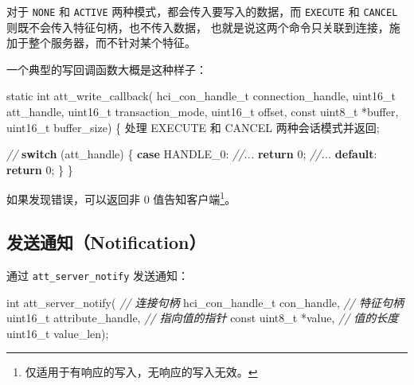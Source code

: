 \documentclass[
  12pt,
]{book}
\newenvironment{Shaded}{\begin{snugshade}}{\end{snugshade}}
\newcommand{\CommentTok}[1]{\textcolor[rgb]{0.56,0.35,0.01}{\textit{#1}}}
\newcommand{\ControlFlowTok}[1]{\textcolor[rgb]{0.13,0.29,0.53}{\textbf{#1}}}
\newcommand{\DataTypeTok}[1]{\textcolor[rgb]{0.13,0.29,0.53}{#1}}
\newcommand{\DecValTok}[1]{\textcolor[rgb]{0.00,0.00,0.81}{#1}}
\newcommand{\NormalTok}[1]{#1}
\begin{document}
对于 \texttt{NONE} 和 \texttt{ACTIVE} 两种模式，都会传入要写入的数据，而 \texttt{EXECUTE} 和 \texttt{CANCEL} 则既不会传入特征句柄，也不传入数据，
也就是说这两个命令只关联到连接，施加于整个服务器，而不针对某个特征。

一个典型的写回调函数大概是这种样子：

\begin{Shaded}
\begin{Highlighting}[]
\DataTypeTok{static} \DataTypeTok{int}\NormalTok{ att_write_callback(}
\NormalTok{  hci_con_handle_t connection_handle, }\DataTypeTok{uint16_t}\NormalTok{ att_handle,}
  \DataTypeTok{uint16_t}\NormalTok{ transaction_mode,}
  \DataTypeTok{uint16_t}\NormalTok{ offset, }\DataTypeTok{const} \DataTypeTok{uint8_t}\NormalTok{ *buffer, }\DataTypeTok{uint16_t}\NormalTok{ buffer_size)}
\NormalTok{\{}
\NormalTok{    处理 EXECUTE 和 CANCEL 两种会话模式并返回;}

    \CommentTok{//}
    \ControlFlowTok{switch}\NormalTok{ (att_handle)}
\NormalTok{    \{}
    \ControlFlowTok{case}\NormalTok{ HANDLE_0:}
        \CommentTok{//...}
        \ControlFlowTok{return} \DecValTok{0}\NormalTok{;}
    \CommentTok{//...}
    \ControlFlowTok{default}\NormalTok{:}
        \ControlFlowTok{return} \DecValTok{0}\NormalTok{;}
\NormalTok{    \}}
\NormalTok{\}}
\end{Highlighting}
\end{Shaded}

如果发现错误，可以返回非 0 值告知客户端\footnote{仅适用于有响应的写入，无响应的写入无效。}。

\hypertarget{ux53d1ux9001ux901aux77e5notification}{%
\subsection{发送通知（Notification）}\label{ux53d1ux9001ux901aux77e5notification}}

通过 \texttt{att\_server\_notify} 发送通知：

\begin{Shaded}
\begin{Highlighting}[]
\DataTypeTok{int}\NormalTok{ att_server_notify(}
  \CommentTok{// 连接句柄}
\NormalTok{  hci_con_handle_t con_handle,}
  \CommentTok{// 特征句柄}
  \DataTypeTok{uint16_t}\NormalTok{ attribute_handle,}
  \CommentTok{// 指向值的指针}
  \DataTypeTok{const} \DataTypeTok{uint8_t}\NormalTok{ *value,}
  \CommentTok{// 值的长度}
  \DataTypeTok{uint16_t}\NormalTok{ value_len);}
\end{Highlighting}
\end{Shaded}
\end{document}
